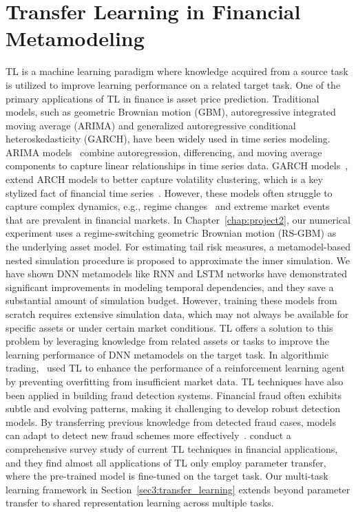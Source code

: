 \section{Transfer Learning in Financial Metamodeling} \label{sec3:background}

TL is a machine learning paradigm where knowledge acquired from a source task is utilized to improve learning performance on a related target task.
One of the primary applications of TL in finance is asset price prediction. 
Traditional models, such as geometric Brownian motion (GBM), autoregressive integrated moving average (ARIMA) and generalized autoregressive conditional heteroskedasticity (GARCH), have been widely used in time series modeling.
ARIMA models~\citep{box1970distribution} combine autoregression, differencing, and moving average components to capture linear relationships in time series data.
GARCH models~\citep{bollerslev1990modelling}, extend ARCH models to better capture volatility clustering, which is a key stylized fact of financial time series~\citep{cont2001empirical}.
However, these models often struggle to capture complex dynamics, e.g., regime changes~\citep{hamilton1989new} and extreme market events~\citep{embrechts2013modelling} that are prevalent in financial markets.
In Chapter~\ref{chap:project2}, our numerical experiment uses a regime-switching geometric Brownian motion (RS-GBM) as the underlying asset model.
For estimating tail risk measures, a metamodel-based nested simulation procedure is proposed to approximate the inner simulation.
We have shown DNN metamodels like RNN and LSTM networks have demonstrated significant improvements in modeling temporal dependencies, and they save a substantial amount of simulation budget.
However, training these models from scratch requires extensive simulation data, which may not always be available for specific assets or under certain market conditions.
TL offers a solution to this problem by leveraging knowledge from related assets or tasks to improve the learning performance of DNN metamodels on the target task.
In algorithmic trading,~\cite{jeong2019improving} used TL to enhance the performance of a reinforcement learning agent by preventing overfitting from insufficient market data.
TL techniques have also been applied in building fraud detection systems. 
Financial fraud often exhibits subtle and evolving patterns, making it challenging to develop robust detection models.
By transferring previous knowledge from detected fraud cases, models can adapt to detect new fraud schemes more effectively~\citep{lebichot2021transfer}.
\cite{yan2024comprehensive} conduct a comprehensive survey study of current TL techniques in financial applications, and they find almost all applications of TL only employ parameter transfer, where the pre-trained model is fine-tuned on the target task.
Our multi-task learning framework in Section~\ref{sec3:transfer_learning} extends beyond parameter transfer to shared representation learning across multiple tasks.

